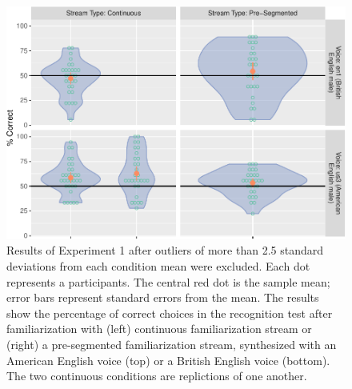 \documentclass[
]{article}
\begin{document}
\begin{figure}

{\centering \includegraphics[width=0.8\linewidth]{segmentation_recall_combined_for_revision4_files/figure-latex/stats-london-stats.3x.us.en.segm.cont.combined.plot-no-outliers-1} 

}

\caption{Results of Experiment 1 after outliers of more than 2.5 standard deviations from each condition mean were excluded. Each dot represents a participants. The central red dot is the sample mean; error bars represent standard errors from the mean. The results show the percentage of correct choices in the recognition test after familiarization with (left) continuous familiarization stream or (right) a pre-segmented familiarization stream, synthesized with an American English voice (top) or a British English voice (bottom). The two continuous conditions are replictions of one another.}\label{fig:stats-london-stats.3x.us.en.segm.cont.combined.plot-no-outliers}
\end{figure}
\end{document}

